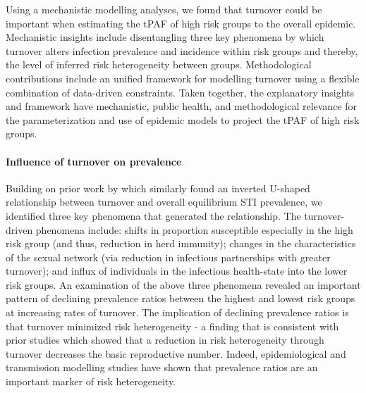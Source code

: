 Using a mechanistic modelling analyses, 
we found that turnover could be important 
when estimating the tPAF
of high risk groups to the overall epidemic.
Mechanistic insights include disentangling 
three key phenomena by which turnover 
alters infection prevalence and incidence within risk groups and 
thereby, the level of inferred risk heterogeneity between groups.
Methodological contributions include an unified 
framework for modelling turnover 
using a flexible combination of data-driven constraints.
Taken together, the explanatory insights and framework
have mechanistic, public health, and methodological relevance 		%
for the parameterization
and use of epidemic models to project the tPAF of high risk groups.

\paragraph{Influence of turnover on prevalence}				%

Building on prior work by \citep{Stigum1994,Zhang2012,Henry2015}
which similarly found an inverted 
U-shaped relationship between
turnover and overall equilibrium STI prevalence, 
we identified three key phenomena that generated the relationship.
The turnover-driven phenomena include: 
shifts in proportion susceptible especially in the high risk group (and thus, reduction in herd immunity); 
changes in the characteristics of the sexual network (via reduction in infectious partnerships with greater turnover); 
and influx of individuals in the infectious health-state into the lower risk groups.
An examination of the above three phenomena revealed an important pattern 
of declining prevalence ratios between the highest and lowest risk groups 
at increasing rates of turnover. 
The implication of declining prevalence ratios 
is that turnover minimized risk heterogeneity - a finding that is
consistent with prior studies			%
\citet{Henry2015} which showed that
a reduction in risk heterogeneity through turnover
decreases the basic reproductive number.
Indeed, epidemiological and transmission modelling studies have shown that prevalence ratios 
are an important marker of risk heterogeneity. %

